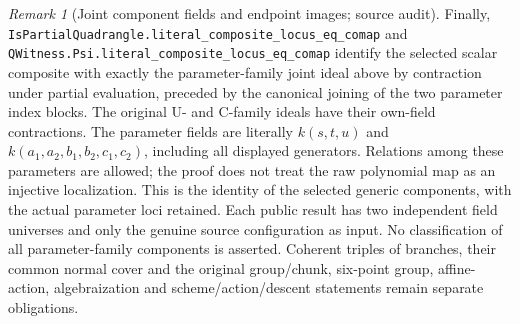 \documentclass[11pt,oneside]{article}
\theoremstyle{definition}
\theoremstyle{remark}
\newtheorem{remark}[theorem]{Remark}
\newcommand{\lean}[1]{\nolinkurl{#1}}
\begin{document}
\begin{remark}[Joint component fields and endpoint images; source audit]
Finally, \lean{IsPartialQuadrangle.literal_composite_locus_eq_comap} and
\lean{QWitness.Psi.literal_composite_locus_eq_comap} identify the selected
scalar composite with exactly the parameter-family joint ideal above by
contraction under partial evaluation, preceded by the canonical joining of
the two parameter index blocks. The original U- and C-family ideals have
their own-field contractions. The parameter fields are literally
$k(s,t,u)$ and $k(a_1,a_2,b_1,b_2,c_1,c_2)$, including all displayed
generators. Relations among these parameters are allowed; the proof does
not treat the raw polynomial map as an injective localization. This is
the identity of the selected generic components, with the actual
parameter loci retained. Each public result has two independent field
universes and only the genuine source configuration as input.
No classification of all parameter-family components is asserted.
Coherent triples of branches, their common normal cover and the original
group/chunk, six-point group, affine-action,
algebraization and scheme/action/descent statements
remain separate obligations.


\end{remark}
\end{document}
